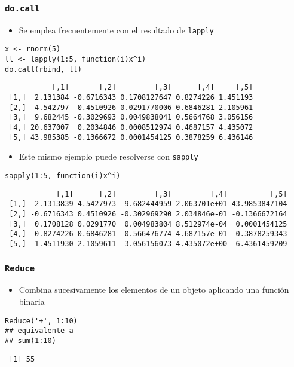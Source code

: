\documentclass[xcolor={usenames,svgnames,dvipsnames}]{beamer}
\begin{document}
\begin{frame}[fragile]
\frametitle{\texttt{do.call}}
\label{sec-4-2}


\begin{itemize}
\item Se emplea frecuentemente con el resultado de \texttt{lapply}
\end{itemize}

\lstset{language=R}
\begin{lstlisting}
x <- rnorm(5)
ll <- lapply(1:5, function(i)x^i)
do.call(rbind, ll)
\end{lstlisting}

\begin{verbatim}
           [,1]       [,2]         [,3]      [,4]     [,5]
 [1,]  2.131384 -0.6716343 0.1708127647 0.8274226 1.451193
 [2,]  4.542797  0.4510926 0.0291770006 0.6846281 2.105961
 [3,]  9.682445 -0.3029693 0.0049838041 0.5664768 3.056156
 [4,] 20.637007  0.2034846 0.0008512974 0.4687157 4.435072
 [5,] 43.985385 -0.1366672 0.0001454125 0.3878259 6.436146
\end{verbatim}

\begin{itemize}
\item Este mismo ejemplo puede resolverse con \texttt{sapply}
\end{itemize}

\lstset{language=R}
\begin{lstlisting}
sapply(1:5, function(i)x^i)
\end{lstlisting}

\begin{verbatim}
            [,1]      [,2]         [,3]         [,4]          [,5]
 [1,]  2.1313839 4.5427973  9.682444959 2.063701e+01 43.9853847104
 [2,] -0.6716343 0.4510926 -0.302969290 2.034846e-01 -0.1366672164
 [3,]  0.1708128 0.0291770  0.004983804 8.512974e-04  0.0001454125
 [4,]  0.8274226 0.6846281  0.566476774 4.687157e-01  0.3878259343
 [5,]  1.4511930 2.1059611  3.056156073 4.435072e+00  6.4361459209
\end{verbatim}
\end{frame}
\begin{frame}[fragile]
\frametitle{\texttt{Reduce}}
\label{sec-4-3}

\begin{itemize}
\item Combina sucesivamente los elementos de un objeto aplicando una
  función binaria
\end{itemize}

\lstset{language=R}
\begin{lstlisting}
Reduce('+', 1:10)
## equivalente a 
## sum(1:10)
\end{lstlisting}

\begin{verbatim}
 [1] 55
\end{verbatim}
\end{frame}
\end{document}
